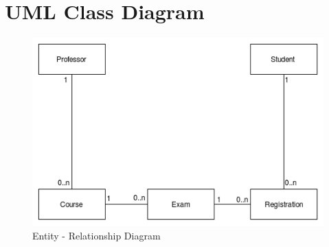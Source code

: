 \documentclass{report}
\begin{document}
\chapter*{UML Class Diagram} 
\begin{figure}[ht]
	\includegraphics[width=1\textwidth]{ClassDiagram.png}
	\caption{Entity - Relationship Diagram}
\end{figure} 

\end{document}
